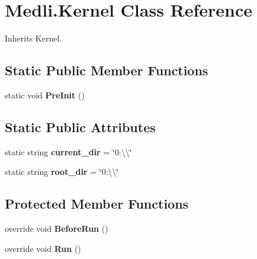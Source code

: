 \hypertarget{class_medli_1_1_kernel}{}\section{Medli.\+Kernel Class Reference}
\label{class_medli_1_1_kernel}


Inherits Kernel.

\subsection*{Static Public Member Functions}
\begin{DoxyCompactItemize}
\item 
\mbox{\label{class_medli_1_1_kernel_acfc8f86634d1db1d9f94374f27a09e7e}} 
static void {\bfseries Pre\+Init} ()
\end{DoxyCompactItemize}
\subsection*{Static Public Attributes}
\begin{DoxyCompactItemize}
\item 
\mbox{\label{class_medli_1_1_kernel_a1cda3243b8ed47c1506b2210627409a7}} 
static string {\bfseries current\+\_\+dir} = \char`\"{}0\+:\textbackslash{}\textbackslash{}\char`\"{}
\item 
\mbox{\label{class_medli_1_1_kernel_a667eeb2da65ffb1b0bb13fa3cd2534e6}} 
static string {\bfseries root\+\_\+dir} = \char`\"{}0\+:\textbackslash{}\textbackslash{}\char`\"{}
\end{DoxyCompactItemize}
\subsection*{Protected Member Functions}
\begin{DoxyCompactItemize}
\item 
\mbox{\label{class_medli_1_1_kernel_a01c61f5c6bf698f8928ab0b9b9d02b61}} 
override void {\bfseries Before\+Run} ()
\item 
\mbox{\label{class_medli_1_1_kernel_a377235f3f12322bb19857a7cb3d999d9}} 
override void {\bfseries Run} ()
\end{DoxyCompactItemize}
